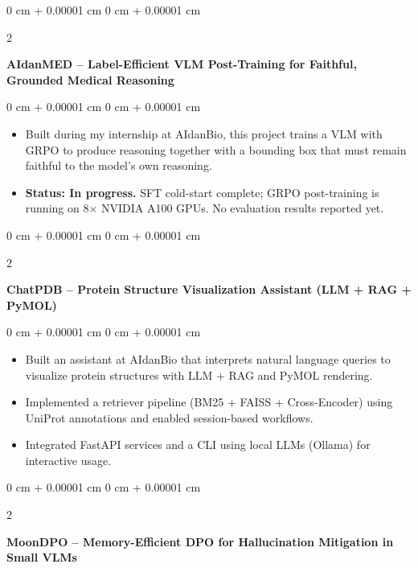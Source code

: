 \documentclass[10pt, letterpaper]{article}
\newenvironment{highlights}{
    \begin{itemize}[
        topsep=0.10 cm,
        parsep=0.10 cm,
        partopsep=0pt,
        itemsep=0pt,
        leftmargin=0 cm + 10pt
    ]
}{
    \end{itemize}
} %
\newenvironment{onecolentry}{
    \begin{adjustwidth}{
        0 cm + 0.00001 cm
    }{
        0 cm + 0.00001 cm
    }
}{
    \end{adjustwidth}
} %
\newenvironment{twocolentry}[2][]{
    \onecolentry
    \def\secondColumn{#2}
    \setcolumnwidth{\fill, 4.5 cm}
    \begin{paracol}{2}
}{
    \switchcolumn \raggedleft \secondColumn
    \end{paracol}
    \endonecolentry
} %
\begin{document}
        \begin{twocolentry}{
        }
            \textbf{AIdanMED -- Label-Efficient VLM Post-Training for Faithful, Grounded Medical Reasoning}\end{twocolentry}

        \vspace{0.10 cm}
        \begin{onecolentry}
            \begin{highlights}
                \item Built during my internship at AIdanBio, this project trains a VLM with GRPO to produce reasoning together with a bounding box that must remain faithful to the model's own reasoning.
                \item \textbf{Status: In progress.} SFT cold-start complete; GRPO post-training is running on 8$\times$ NVIDIA A100 GPUs. No evaluation results reported yet.
            \end{highlights}
        \end{onecolentry}

        \vspace{0.2 cm}

        \begin{twocolentry}{
        }
            \textbf{ChatPDB – Protein Structure Visualization Assistant (LLM + RAG + PyMOL)}\end{twocolentry}

        \vspace{0.10 cm}
        \begin{onecolentry}
            \begin{highlights}
            \item Built an assistant at AIdanBio that interprets natural language queries to visualize protein structures with LLM + RAG and PyMOL rendering.
            \item Implemented a retriever pipeline (BM25 + FAISS + Cross-Encoder) using UniProt annotations and enabled session-based workflows.
            \item Integrated FastAPI services and a CLI using local LLMs (Ollama) for interactive usage.
            \end{highlights}
        \end{onecolentry}

        \vspace{0.2 cm}

        \begin{twocolentry}{
        }
            \textbf{MoonDPO -- Memory-Efficient DPO for Hallucination Mitigation in Small VLMs} \href{https://github.com/thurawk/MoonDPO}{\faGithub}\end{twocolentry}
\end{document}
